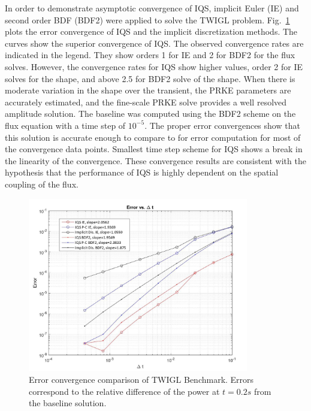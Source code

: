 \documentclass{elsarticle}
\newcommand{\fig}[1]{Fig.~\ref{#1}}                      %
\begin{document}

In order to demonstrate asymptotic convergence of IQS, implicit Euler (IE) and second order BDF (BDF2) were applied to solve the TWIGL problem. \fig{fig:TWIGL_conv} plots the error convergence of IQS and the implicit discretization methods.  The curves show the superior convergence of IQS. The observed convergence rates are indicated in the legend. They show orders 1 for IE and 2 for BDF2 for the flux solves. However, the convergence rates for IQS show higher values, order 2 for IE solves for the shape, and above 2.5 for BDF2 solve of the shape. When there is moderate variation in the shape over the transient, the PRKE parameters are accurately estimated, and the fine-scale PRKE solve provides a well resolved amplitude solution.
The baseline was computed using the BDF2 scheme on the flux equation with a time step of $10^{-5}$. The proper error convergences show that this solution is accurate enough to compare to for error computation for most of the convergence data points. Smallest time step scheme for IQS shows a break in the linearity of the convergence.
These convergence results are consistent with the hypothesis that the performance of IQS is highly dependent on the spatial coupling of the flux.

\begin{figure}[!htbp]
\centering
\includegraphics[height=3in]{figures/TWIGL_convergence.jpg}
\caption{Error convergence comparison of TWIGL Benchmark. Errors correspond to the relative difference of the power at $t=0.2 s$ from the baseline solution.}
\label{fig:TWIGL_conv}
\end{figure}
\end{document}
